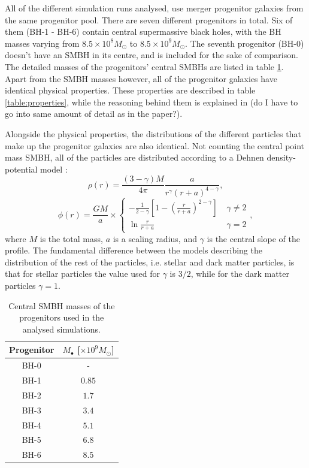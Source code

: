 \documentclass[english, oneside]{HYgradu}
\begin{document}
All of the different simulation runs analysed, use merger progenitor galaxies from the same progenitor pool. There are seven different progenitors in total. Six of them (BH-1 - BH-6) contain central supermassive black holes, with the BH masses varying from $8.5 \times 10^8 M_\odot$ to $8.5 \times 10^9 M_\odot$. The seventh progenitor (BH-0) doesn't have an SMBH in its centre, and is included for the sake of comparison. The detailed masses of the progenitors' central SMBHs are listed in table \ref{table:progenitors}. Apart from the SMBH masses however, all of the progenitor galaxies have identical physical properties. These properties are described in table \ref{table:properties}, while the reasoning behind them is explained in \cite{Rantala2018} (do I have to go into same amount of detail as in the paper?).

Alongside the physical properties, the distributions of the different particles that make up the progenitor galaxies are also identical. Not counting the central point mass SMBH, all of the particles are distributed according to a Dehnen density-potential model \citep{Dehnen1993}:
\begin{equation}
\rho(r) = \frac{(3-\gamma)M}{4\pi} \frac{a}{r^\gamma (r+a)^{4-\gamma}},
\end{equation}
\begin{equation}
\phi(r) = \frac{GM}{a} \times 
\begin{cases}
	-\frac{1}{2-\gamma} \left[ 1 - \left( \frac{r}{r+a} \right)^{2-\gamma} \right] & \; \gamma \neq 2 \\
	\ln \frac{r}{r+a}	 & \; \gamma = 2
\end{cases},
\end{equation}
where $M$ is the total mass, $a$ is a scaling radius, and $\gamma$ is the central slope of the profile. The fundamental difference between the models describing the distribution of the rest of the particles, i.e. stellar and dark matter particles, is that for stellar particles the value used for $\gamma$  is $3/2$, while for the dark matter particles $\gamma = 1$.

\begin{table}
	\begin{center}
		\begin{tabular}{c c}
		\hline
		\hline
		Progenitor & $M_\bullet$ [$\times 10^9 M_\odot$] \\
		\hline
		BH-0 & - \\
		BH-1 & $0.85$ \\
		BH-2 & $1.7$ \\
		BH-3 & $3.4$ \\
		BH-4 & $5.1$ \\
		BH-5 & $6.8$ \\
		BH-6 & $8.5$ \\
		\hline
		\end{tabular}
	\end{center}
	\caption{Central SMBH masses of the progenitors used in the analysed simulations.}
	\label{table:progenitors}
\end{table}
\end{document}
